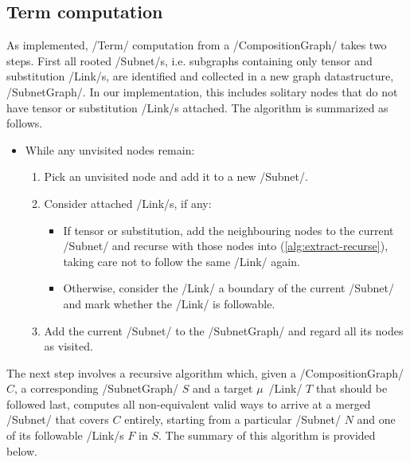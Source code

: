 \documentclass[12pt,a4paper]{article}
\begin{document}
\subsection{Term computation}

As implemented, \hs/Term/ computation from a \hs/CompositionGraph/ takes two steps. First all rooted \hs/Subnet/s, i.e. subgraphs containing only tensor and substitution \hs/Link/s, are identified and collected in a new graph datastructure, \hs/SubnetGraph/. In our implementation, this includes solitary nodes that do not have tensor or substitution \hs/Link/s attached. The algorithm is summarized as follows.
\begin{itemize}
    \item While any unvisited nodes remain:\begin{enumerate}
        \item Pick an unvisited node and add it to a new \hs/Subnet/.
        \item\label{alg:extract-recurse} Consider attached \hs/Link/s, if any:\begin{itemize}
            \item If tensor or substitution, add the neighbouring nodes to the current \hs/Subnet/ and recurse with those nodes into (\ref{alg:extract-recurse}), taking care not to follow the same \hs/Link/ again.
            \item Otherwise, consider the \hs/Link/ a boundary of the current \hs/Subnet/ and mark whether the \hs/Link/ is followable.
        \end{itemize}
        \item Add the current \hs/Subnet/ to the \hs/SubnetGraph/ and regard all its nodes as visited.
    \end{enumerate}
\end{itemize}
The next step involves a recursive algorithm which, given a \hs/CompositionGraph/ $C$, a corresponding \hs/SubnetGraph/ $S$ and a target $\mu$~\hs/Link/ $T$ that should be followed last, computes all non-equivalent valid ways to arrive at a merged \hs/Subnet/ that covers $C$ entirely, starting from a particular \hs/Subnet/ $N$ and one of its followable \hs/Link/s $F$ in $S$. The summary of this algorithm is provided below.
\end{document}
